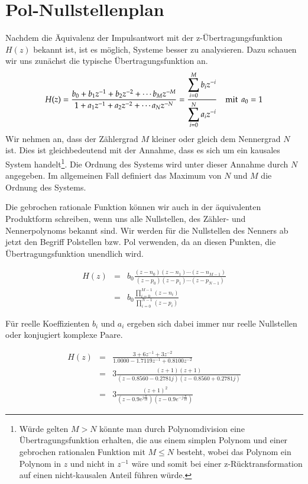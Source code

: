 \section{Pol-Nullstellenplan}
Nachdem die Äquivalenz der Impulsantwort mit der
z-Übertragungsfunktion $H(z)$ bekannt ist, ist es möglich, Systeme
besser zu analysieren. Dazu schauen wir uns zunächst die typische
Übertragungsfunktion an.
\begin{equation}\label{eq:Uebertragungsfunktion}
 H(z) = \frac{b_0 + b_1z^{-1} + b_2z^{-2}+ \cdots b_M z^{-M}
    }{1 + a_1z^{-1} + a_2z^{-2}+ \cdots a_N z^{-N}}
    = \frac{\displaystyle \sum_{i=0}^M b_iz^{-i}}
    {\displaystyle \sum_{i=0}^N a_i z^{-i}} \quad\mathrm{mit}\;\, a_0 = 1
\end{equation}
Wir nehmen an, dass der Zählergrad $M$ kleiner oder gleich dem
Nennergrad $N$ ist. Dies ist gleichbedeutend mit der Annahme, dass
es sich um ein kausales System handelt\footnote{Würde gelten $M>N$
könnte man durch Polynomdivision eine Übertragungsfunktion
erhalten, die aus einem simplen Polynom und einer gebrochen
rationalen Funktion mit $M\leq N$ besteht, wobei das Polynom ein
Polynom in $z$ und nicht in $z^{-1}$ wäre und somit bei einer
z-Rücktransformation auf einen nicht-kausalen Anteil führen
würde.}. Die Ordnung des Systems wird unter dieser Annahme durch $N$
angegeben. Im allgemeinen Fall definiert das Maximum von $N$ und $M$
die Ordnung des Systems.

Die gebrochen rationale Funktion können wir auch in der
äquivalenten Produktform schreiben, wenn uns alle Nullstellen, des
Zähler- und Nennerpolynoms bekannt sind. Wir werden für die
Nullstellen des Nenners ab jetzt den Begriff Polstellen bzw. Pol
verwenden, da an diesen Punkten, die Übertragungsfunktion
unendlich wird.

\begin{eqnarray}\label{eq:Uebertragungsfunktion:Produktdarstellung}
 H(z)
 & = & b_0 \frac{(z-n_0)(z-n_1)\cdots(z-n_{M-1})}{(z-p_0)(z-p_1)\cdots(z-p_{N-1})}\\
 & = & b_0 \frac{\displaystyle \prod_{i = 0}^{M-1}(z-n_i)}
 {\displaystyle \prod_{i = 0}^{N-1}(z-p_i)}
 \end{eqnarray}

Für reelle Koeffizienten $b_i$ und $a_i$ ergeben sich dabei immer
nur reelle Nullstellen oder konjugiert komplexe Paare.

\begin{example}
\begin{eqnarray}\nonumber
    H(z) & = & \frac{3+6z^{-1}+3z^{-2}}{1.0000   -1.7119 z^{-1} +   0.8100
    z^{-2}}\\\nonumber
    &=& 3\frac{(z+1)(z+1)}{(z-0.8560 - 0.2781j)(z-0.8560 +
    0.2781j)}\\\nonumber
    &=& 3\frac{(z+1)^2}{(z-0.9e^{j\frac{\pi}{10}})(z-0.9e^{-j\frac{\pi}{10}})}
\end{eqnarray}
\end{example}

